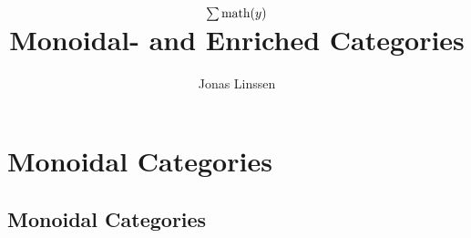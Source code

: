 

\title{
	$\sum\text{math}(y)$\\
	Monoidal- and Enriched Categories
}
\author{Jonas Linssen}

\usetikzlibrary{fit}


	\maketitle
	\tableofcontents

	\newpage
	\section{Monoidal Categories}
	\subsection{Monoidal Categories}

